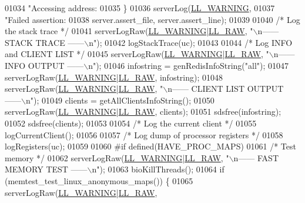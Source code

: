 \begin{DoxyCode}
{{{{{{{{{{{{{{{{{{{{{{{{{{{{{{{{{{{{{{{{{{{{{{{{{{{{{{{{{{{{{{{{{{{{01034         \textcolor{stringliteral}{"Accessing address: %
01035     \}
01036     serverLog(\hyperlink{server_8h_a31229b9334bba7d6be2a72970967a14b}{LL\_WARNING},
01037         \textcolor{stringliteral}{"Failed assertion: %
01038                         server.assert\_file, server.assert\_line);
01039 
01040     \textcolor{comment}{/* Log the stack trace */}
01041     serverLogRaw(\hyperlink{server_8h_a31229b9334bba7d6be2a72970967a14b}{LL\_WARNING}|\hyperlink{server_8h_a6b3768a4d2dfb3ac580b8d999baa9350}{LL\_RAW}, \textcolor{stringliteral}{"\(\backslash\)n------ STACK TRACE ------\(\backslash\)n"});
01042     logStackTrace(uc);
01043 
01044     \textcolor{comment}{/* Log INFO and CLIENT LIST */}
01045     serverLogRaw(\hyperlink{server_8h_a31229b9334bba7d6be2a72970967a14b}{LL\_WARNING}|\hyperlink{server_8h_a6b3768a4d2dfb3ac580b8d999baa9350}{LL\_RAW}, \textcolor{stringliteral}{"\(\backslash\)n------ INFO OUTPUT ------\(\backslash\)n"});
01046     infostring = genRedisInfoString(\textcolor{stringliteral}{"all"});
01047     serverLogRaw(\hyperlink{server_8h_a31229b9334bba7d6be2a72970967a14b}{LL\_WARNING}|\hyperlink{server_8h_a6b3768a4d2dfb3ac580b8d999baa9350}{LL\_RAW}, infostring);
01048     serverLogRaw(\hyperlink{server_8h_a31229b9334bba7d6be2a72970967a14b}{LL\_WARNING}|\hyperlink{server_8h_a6b3768a4d2dfb3ac580b8d999baa9350}{LL\_RAW}, \textcolor{stringliteral}{"\(\backslash\)n------ CLIENT LIST OUTPUT ------\(\backslash\)n"});
01049     clients = getAllClientsInfoString();
01050     serverLogRaw(\hyperlink{server_8h_a31229b9334bba7d6be2a72970967a14b}{LL\_WARNING}|\hyperlink{server_8h_a6b3768a4d2dfb3ac580b8d999baa9350}{LL\_RAW}, clients);
01051     sdsfree(infostring);
01052     sdsfree(clients);
01053 
01054     \textcolor{comment}{/* Log the current client */}
01055     logCurrentClient();
01056 
01057     \textcolor{comment}{/* Log dump of processor registers */}
01058     logRegisters(uc);
01059 
01060 \textcolor{preprocessor}{#}\textcolor{preprocessor}{if} \textcolor{preprocessor}{defined}\textcolor{preprocessor}{(}HAVE\_PROC\_MAPS\textcolor{preprocessor}{)}
01061     \textcolor{comment}{/* Test memory */}
01062     serverLogRaw(\hyperlink{server_8h_a31229b9334bba7d6be2a72970967a14b}{LL\_WARNING}|\hyperlink{server_8h_a6b3768a4d2dfb3ac580b8d999baa9350}{LL\_RAW}, \textcolor{stringliteral}{"\(\backslash\)n------ FAST MEMORY TEST ------\(\backslash\)n"});
01063     bioKillThreads();
01064     \textcolor{keywordflow}{if} (memtest\_test\_linux\_anonymous\_maps()) \{
01065         serverLogRaw(\hyperlink{server_8h_a31229b9334bba7d6be2a72970967a14b}{LL\_WARNING}|\hyperlink{server_8h_a6b3768a4d2dfb3ac580b8d999baa9350}{LL\_RAW},
}}}}}}}}}}}}}}}}}}}}}}}}}}}}}}}}}}}}}}}}}}}}}}}}}}}}}}}}}}}}}}}}}}}}}}
\end{DoxyCode}
